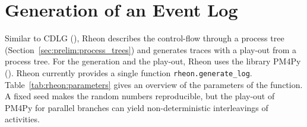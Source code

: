 \section{Generation of an Event Log}
\label{sec:rheon:generation}

Similar to CDLG (\textcite{grimm2022cdlg}), Rheon describes the control-flow through a process tree (Section~\ref{sec:prelim:process_trees}) and generates traces with a play-out from a process tree.
For the generation and the play-out, Rheon uses the library PM4Py (\textcite{berti2019pm4py}).
Rheon currently provides a single function \texttt{rheon.generate\_log}. Table~\ref{tab:rheon:parameters} gives an overview of the parameters of the function. A fixed seed makes the random numbers reproducible, but the play-out of PM4Py for parallel branches can yield non-deterministic interleavings of activities.


